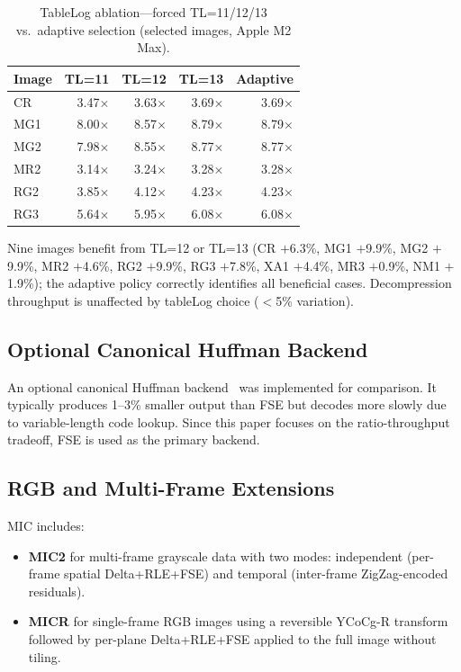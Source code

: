 \documentclass[journal]{IEEEtran}
\begin{document}
\begin{table}[htbp]
\centering
\caption{TableLog ablation---forced TL=11/12/13 vs.\ adaptive selection
(selected images, Apple M2 Max).}
\label{tab:tablelog-ablation}
\scriptsize
\begin{tabular}{lrrrr}
\toprule
Image & TL=11 & TL=12 & TL=13 & Adaptive \\
\midrule
CR  & 3.47$\times$ & 3.63$\times$ & 3.69$\times$ & 3.69$\times$ \\
MG1 & 8.00$\times$ & 8.57$\times$ & 8.79$\times$ & 8.79$\times$ \\
MG2 & 7.98$\times$ & 8.55$\times$ & 8.77$\times$ & 8.77$\times$ \\
MR2 & 3.14$\times$ & 3.24$\times$ & 3.28$\times$ & 3.28$\times$ \\
RG2 & 3.85$\times$ & 4.12$\times$ & 4.23$\times$ & 4.23$\times$ \\
RG3 & 5.64$\times$ & 5.95$\times$ & 6.08$\times$ & 6.08$\times$ \\
\bottomrule
\end{tabular}
\end{table}

Nine images benefit from TL=12 or TL=13 (CR $+$6.3\%, MG1 $+$9.9\%, MG2
$+$9.9\%, MR2 $+$4.6\%, RG2 $+$9.9\%, RG3 $+$7.8\%, XA1 $+$4.4\%, MR3
$+$0.9\%, NM1 $+$1.9\%); the adaptive policy correctly identifies all
beneficial cases. Decompression throughput is unaffected by tableLog choice
($<$5\% variation).

\subsection{Optional Canonical Huffman Backend}

An optional canonical Huffman backend~\cite{schwartz1964} was implemented for comparison. It
typically produces 1--3\% smaller output than FSE but decodes more slowly due to
variable-length code lookup. Since this paper focuses on the ratio-throughput
tradeoff, FSE is used as the primary backend.

\subsection{RGB and Multi-Frame Extensions}

MIC includes:
\begin{itemize}
  \item \textbf{MIC2} for multi-frame grayscale data with two modes: independent
  (per-frame spatial Delta+RLE+FSE) and temporal (inter-frame ZigZag-encoded
  residuals).
  \item \textbf{MICR} for single-frame RGB images using a reversible YCoCg-R
  transform~\cite{ycocgr} followed by per-plane Delta+RLE+FSE applied to the
  full image without tiling.
\end{itemize}
\end{document}
